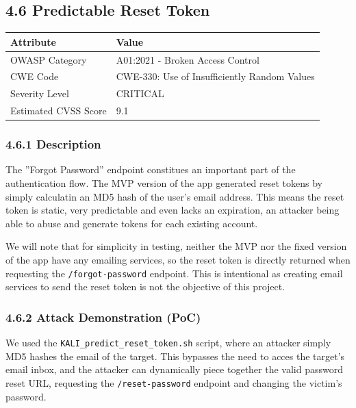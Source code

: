 \documentclass[11pt]{article}
\begin{document}
\subsection*{4.6 Predictable Reset Token}

\begin{table}[htbp]
\centering
\begin{tabular}{|l|l|}
\hline
\textbf{Attribute} & \textbf{Value} \\ \hline
OWASP Category & A01:2021 - Broken Access Control \\ \hline
CWE Code & CWE-330: Use of Insufficiently Random Values \\ \hline
Severity Level & CRITICAL \\ \hline
Estimated CVSS Score & 9.1 \\ \hline
\end{tabular}
\end{table}

\subsubsection*{4.6.1 Description}

The ''Forgot Password'' endpoint constitues an important part of the authentication flow. The MVP version of the app generated reset tokens by simply calculatin an MD5 hash of the user's email address. This means the reset token is static, very predictable and even lacks an expiration, an attacker being able to abuse and generate tokens for each existing account.

We will note that for simplicity in testing, neither the MVP nor the fixed version of the app have any emailing services, so the reset token is directly returned when requesting the \texttt{/forgot-password} endpoint. This is intentional as creating email services to send the reset token is not the objective of this project.

\subsubsection*{4.6.2 Attack Demonstration (PoC)}

We used the \texttt{KALI\_predict\_reset\_token.sh} script, where an attacker simply MD5 hashes the email of the target. This bypasses the need to acces the target's email inbox, and the attacker can dynamically piece together the valid password reset URL, requesting the \texttt{/reset-password} endpoint and changing the victim's password.
\end{document}
